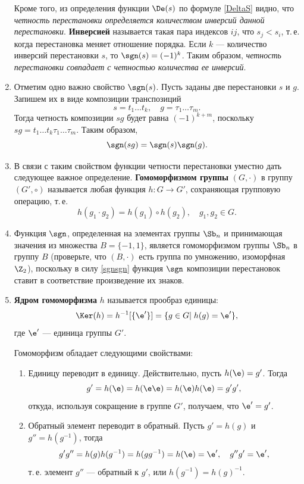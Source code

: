 \begin{enumerate}
Кроме того, из определения функции $\De(s)$ по формуле \eqref{DeltaS} видно, что \textit{четность перестановки  определяется количеством инверсий данной перестановки}. \textbf{Инверсией} называется такая пара индексов $ij$, что $s_j<s_i$, т.\,е. когда перестановка меняет отношение порядка. Если $k$ --- количество инверсий перестановки $s$, то $\sgn(s)=(-1)^k$. Таким образом, \textit{четность перестановки совпадает с четностью количества ее инверсий}.




\item Отметим одно важно свойство $\sgn(s)$. Пусть заданы две перестановки $s$ и $g$. Запишем их в виде композиции транспозиций
$$
s=t_1\dots t_k,\quad g=\tau_1\dots\tau_m.
$$
Тогда четность композиции $sg$ будет равна $(-1)^{k+m}$, поскольку $sg=t_1\dots t_k\tau_1\dots\tau_m$. Таким образом,
\begin{equation}\label{sgnsgn}
\sgn(sg)=\sgn(s)\sgn(g).
\end{equation}
\item В связи с таким свойством функции четности перестановки уместно дать следующее важное определение.
\textbf{Гомоморфизмом группы} $(G,\cdot)$ в группу $(G',\circ)$ называется любая функция $h:G\to G'$, сохраняющая групповую операцию, т.\,е.
$$
h(g_1\cdot g_2)=h(g_1)\circ h(g_2),\quad g_1,g_2\in G.
$$

\item Функция $\sgn$, определенная на элементах группы $\Sb_n$ и принимающая значения из множества $B=\{-1,1\}$, является гомоморфизмом группы $\Sb_n$ в группу $B$ (проверьте, что $(B,\cdot)$ есть группа по умножению, изоморфная $\Z_2$), поскольку в силу \eqref{sgnsgn} функция $\sgn$ композиции перестановок ставит в соответствие произведение их знаков.

\item \textbf{Ядром гомоморфизма} $h$ называется прообраз единицы:
$$
\Ker(h)= h^{-1}[\{\e'\}]=\{g\in G|\;h(g)=\e'\},
$$
где $\e'$ --- единица группы $G'$.

Гомоморфизм обладает следующими свойствами:
\begin{enumerate}[\bf Hom1]
\item Единицу переводит в единицу. Действительно, пусть $h(\e)=g'$. Тогда
$$
g'=h(\e)=h(\e\e)=h(\e)h(\e)=g'g',
$$
откуда, используя сокращение в группе $G'$, получаем, что $\e'=g'$.

\item Обратный элемент переводит в обратный. Пусть $g'=h(g)$ и $g''=h(g^{-1})$, тогда
$$
g'g'' = h(g)h(g^{-1})=h(gg^{-1})=h(\e)=\e',\quad g''g'=\e',
$$
т.\,е. элемент $g''$ --- обратный к $g'$, или $h(g^{-1})=h(g)^{-1}$.


\end{enumerate}
\end{enumerate}
